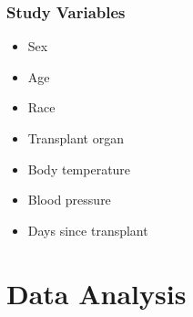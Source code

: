 \documentclass[xcolor=dvipsnames]{beamer}
\begin{document}


\begin{frame}
\frametitle{Study Variables}
\begin{itemize}
\item Sex
\item Age
\item Race 
\item Transplant organ
\item Body temperature
\item Blood pressure
\item Days since transplant
\end{itemize}
\end{frame}


\section{Data Analysis}
\end{document}
